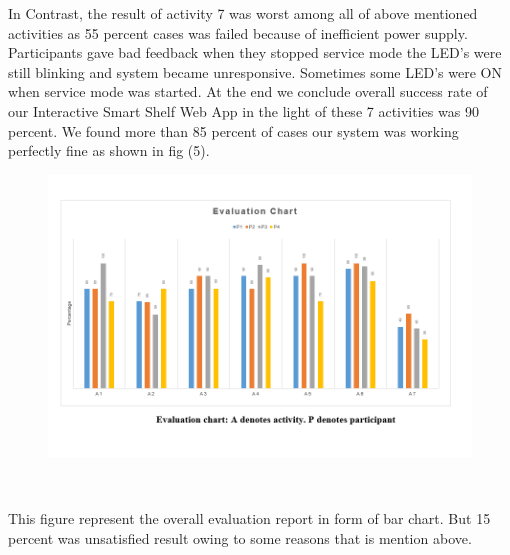 In Contrast, the result of activity 7 was worst among all of above mentioned activities as 55 percent cases was failed because of inefficient power supply. Participants gave bad feedback when they stopped service mode the LED's were still blinking and system became unresponsive. Sometimes some LED's were ON when service mode was started. 
At the end we conclude overall success rate of our Interactive Smart Shelf Web App in the light of these 7 activities was 90 percent. We found more than 85 percent of cases our system was working perfectly fine as shown in fig (5). 
%
\begin{figure}
	\includegraphics[width=1.1\columnwidth]{figures/Chart}
	\caption{}~\label{fig:Chart}
\end{figure}
%

This figure represent the overall evaluation report in form of bar chart. But 15 percent was unsatisfied result owing to some reasons that is mention above.
